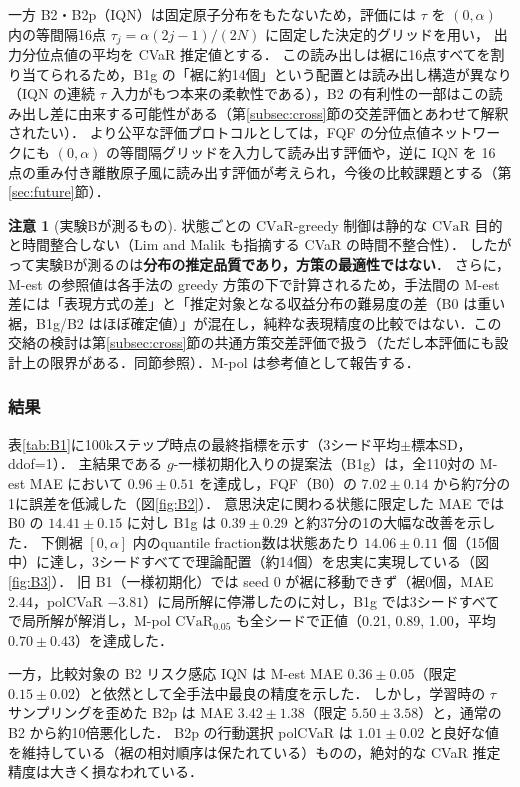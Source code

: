 \documentclass[a4paper,10pt]{jsarticle}
\theoremstyle{definition}
\newtheorem{remark}{注意}[section]
\newcommand{\CVaR}{\mathrm{CVaR}}
\begin{document}
\begin{enumerate}
  一方 B2・B2p（IQN）は固定原子分布をもたないため，評価には $\tau$ を $(0,\alpha)$ 内の等間隔16点 $\tau_j=\alpha(2j-1)/(2N)$ に固定した決定的グリッドを用い，
  出力分位点値の平均を CVaR 推定値とする．
  この読み出しは裾に16点すべてを割り当てられるため，B1g の「裾に約14個」という配置とは読み出し構造が異なり（IQN の連続 $\tau$ 入力がもつ本来の柔軟性である），B2 の有利性の一部はこの読み出し差に由来する可能性がある（第\ref{subsec:cross}節の交差評価とあわせて解釈されたい）．
  より公平な評価プロトコルとしては，FQF の分位点値ネットワークにも $(0,\alpha)$ の等間隔グリッドを入力して読み出す評価や，逆に IQN を 16 点の重み付き離散原子風に読み出す評価が考えられ，今後の比較課題とする（第\ref{sec:future}節）．
\end{enumerate}

\begin{remark}[実験Bが測るもの]
状態ごとの $\CVaR$-greedy 制御は静的な $\CVaR$ 目的と時間整合しない（Lim and Malik \cite{lim2022distributional} も指摘する CVaR の時間不整合性）．
したがって実験Bが測るのは\textbf{分布の推定品質であり，方策の最適性ではない}．
さらに，M-est の参照値は各手法の greedy 方策の下で計算されるため，手法間の M-est 差には「表現方式の差」と「推定対象となる収益分布の難易度の差（B0 は重い裾，B1g/B2 はほぼ確定値）」が混在し，純粋な表現精度の比較ではない．この交絡の検討は第\ref{subsec:cross}節の共通方策交差評価で扱う（ただし本評価にも設計上の限界がある．同節参照）．M-pol は参考値として報告する．
\end{remark}

\subsubsection{結果}
表\ref{tab:B1}に100kステップ時点の最終指標を示す（3シード平均$\pm$標本SD，ddof=1）．
主結果である $g$-一様初期化入りの提案法（B1g）は，全110対の M-est MAE において $0.96\pm0.51$ を達成し，FQF（B0）の $7.02\pm0.14$ から約7分の1に誤差を低減した（図\ref{fig:B2}）．
意思決定に関わる状態に限定した MAE では B0 の $14.41\pm0.15$ に対し B1g は $0.39\pm0.29$ と約37分の1の大幅な改善を示した．
下側裾 $[0,\alpha]$ 内のquantile fraction数は状態あたり $14.06\pm0.11$ 個（15個中）に達し，3シードすべてで理論配置（約14個）を忠実に実現している（図\ref{fig:B3}）．
旧 B1（一様初期化）では seed 0 が裾に移動できず（裾0個，MAE 2.44，polCVaR $-3.81$）に局所解に停滞したのに対し，B1g では3シードすべてで局所解が解消し，M-pol $\CVaR_{0.05}$ も全シードで正値（0.21, 0.89, 1.00，平均 $0.70\pm0.43$）を達成した．

一方，比較対象の B2 リスク感応 IQN は M-est MAE $0.36\pm0.05$（限定 $0.15\pm0.02$）と依然として全手法中最良の精度を示した．
しかし，学習時の $\tau$ サンプリングを歪めた B2p は MAE $3.42\pm1.38$（限定 $5.50\pm3.58$）と，通常の B2 から約10倍悪化した．
B2p の行動選択 polCVaR は $1.01\pm0.02$ と良好な値を維持している（裾の相対順序は保たれている）ものの，絶対的な CVaR 推定精度は大きく損なわれている．
\end{document}
